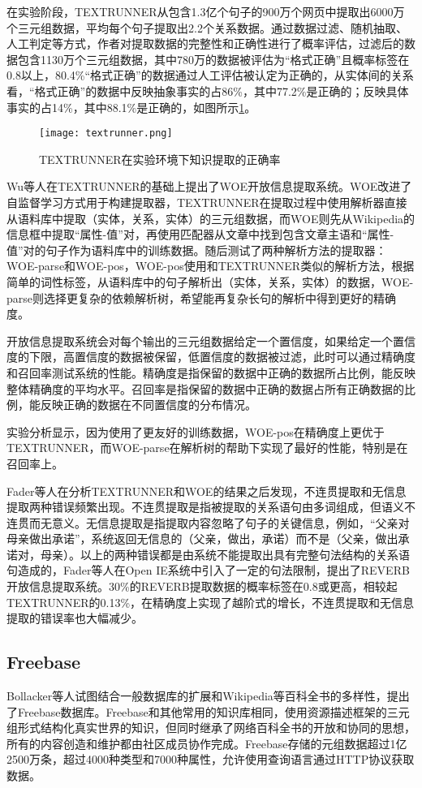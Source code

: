 在实验阶段，TEXTRUNNER从包含1.3亿个句子的900万个网页中提取出6000万个三元组数据，平均每个句子提取出2.2个关系数据。通过数据过滤、随机抽取、人工判定等方式，作者对提取数据的完整性和正确性进行了概率评估，过滤后的数据包含1130万个三元组数据，其中780万的数据被评估为“格式正确”且概率标签在0.8以上，80.4\%“格式正确”的数据通过人工评估被认定为正确的，从实体间的关系看，“格式正确”的数据中反映抽象事实的占86\%，其中77.2\%是正确的；反映具体事实的占14\%，其中88.1\%是正确的，如图所示\ref{textrunner}。
\begin{figure}[H]
	\centering
	\texttt{[image: textrunner.png]}
	\caption{TEXTRUNNER在实验环境下知识提取的正确率}
	\label{textrunner}
\end{figure}

Wu等人在TEXTRUNNER的基础上提出了WOE开放信息提取系统。WOE改进了自监督学习方式用于构建提取器，TEXTRUNNER在提取过程中使用解析器直接从语料库中提取（实体，关系，实体）的三元组数据，而WOE则先从Wikipedia的信息框中提取“属性-值”对，再使用匹配器从文章中找到包含文章主语和“属性-值”对的句子作为语料库中的训练数据。随后测试了两种解析方法的提取器：WOE-parse和WOE-pos，WOE-pos使用和TEXTRUNNER类似的解析方法，根据简单的词性标签，从语料库中的句子解析出（实体，关系，实体）的数据，WOE-parse则选择更复杂的依赖解析树，希望能再复杂长句的解析中得到更好的精确度。

开放信息提取系统会对每个输出的三元组数据给定一个置信度，如果给定一个置信度的下限，高置信度的数据被保留，低置信度的数据被过滤，此时可以通过精确度和召回率测试系统的性能。精确度是指保留的数据中正确的数据所占比例，能反映整体精确度的平均水平。召回率是指保留的数据中正确的数据占所有正确数据的比例，能反映正确的数据在不同置信度的分布情况。

实验分析显示，因为使用了更友好的训练数据，WOE-pos在精确度上更优于TEXTRUNNER，而WOE-parse在解析树的帮助下实现了最好的性能，特别是在召回率上。

Fader等人在分析TEXTRUNNER和WOE的结果之后发现，不连贯提取和无信息提取两种错误频繁出现。不连贯提取是指被提取的关系语句由多词组成，但语义不连贯而无意义。无信息提取是指提取内容忽略了句子的关键信息，例如，“父亲对母亲做出承诺”，系统返回无信息的（父亲，做出，承诺）而不是（父亲，做出承诺对，母亲）。以上的两种错误都是由系统不能提取出具有完整句法结构的关系语句造成的，Fader等人在Open IE系统中引入了一定的句法限制，提出了REVERB开放信息提取系统。30\%的REVERB提取数据的概率标签在0.8或更高，相较起TEXTRUNNER的0.13\%，在精确度上实现了越阶式的增长，不连贯提取和无信息提取的错误率也大幅减少。

\subsection{Freebase}
Bollacker等人试图结合一般数据库的扩展和Wikipedia等百科全书的多样性，提出了Freebase数据库。Freebase和其他常用的知识库相同，使用资源描述框架的三元组形式结构化真实世界的知识，但同时继承了网络百科全书的开放和协同的思想，所有的内容创造和维护都由社区成员协作完成。Freebase存储的元组数据超过1亿2500万条，超过4000种类型和7000种属性，允许使用查询语言通过HTTP协议获取数据。

